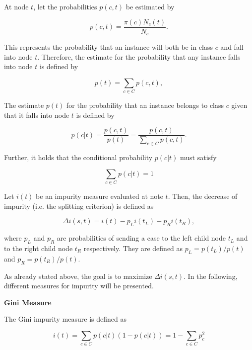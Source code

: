 At node \(t\), let the probabilities \(p(c,t)\) be estimated by 

\begin{equation}
    p(c,t) = \frac{ \pi(c)N_{c}(t) }{ N_{c} }.
\end{equation}

This represents the probability that an instance will both be in class \(c\) and fall into node \(t\).
Therefore, the estimate for the probability that any instance falls into node \(t\) is defined by

\begin{equation}
    p(t) = \sum_{c \in C} p(c,t),
\end{equation}

The estimate \( p(t) \) for the probability that an instance belongs to class \(c\) given that it falls into node \(t\) is defined by

\begin{equation}
    p(c|t) = \frac{ p(c,t)}{ p(t) } = \frac{ p(c,t) }{ \sum_{c \in C} p(c,t) }.
\end{equation}

Further, it holds that the conditional probability \(p(c|t)\) must satisfy

\begin{equation}
    \sum_{c \in C} p(c|t)  = 1
\end{equation}

Let \(i(t)\) be an impurity measure evaluated at note \(t\). 
Then, the decrease of impurity (i.e. the splitting criterion) is defined as

\begin{equation}
    \Delta i(s,t) = i(t) - p_{L} i(t_{L}) - p_{R} i(t_{R}),
\end{equation}

where \(p_{L}\) and \(p_{R}\) are probabilities of sending a case to the left child node \(t_{L}\) and to the
right child node \(t_{R}\) respectively. 
They are defined as \( p_{L} = p(t_{L}) / p(t) \) and \( p_{R} = p(t_{R}) / p(t) \).

As already stated above, the goal is to maximize \(\Delta i(s,t)\).
In the following, different measures for impurity will be presented.

\textbf{Gini Measure}

The Gini impurity measure is defined as 


\begin{equation}
    i(t) = \sum_{c \in C} p(c|t) (1 - p(c|t)) = 1 - \sum_{c \in C} p_{c}^{2}
\end{equation}

